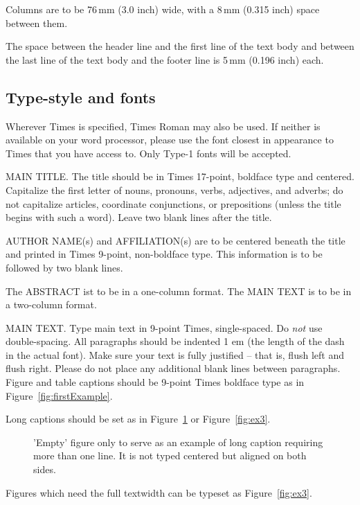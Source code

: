 Columns are to be 76\,mm (3.0 inch) wide, with a 8\,mm (0.315 inch) space
between them.

The space between the header line and the first line of the text body and
between the last line of the text body and the footer line is 5\,mm
(0.196 inch) each.

\subsection{Type-style and fonts}

Wherever Times is specified, Times Roman may also be used. If
neither is available on your word processor, please use the font
closest in appearance to Times that you have access to. Only
Type-1 fonts will be accepted.

MAIN TITLE. The title should be in Times 17-point, boldface type and
centered. Capitalize the first letter of nouns, pronouns, verbs, adjectives,
and adverbs; do not capitalize articles, coordinate conjunctions, or
prepositions (unless the title begins with such a word). Leave two blank
lines after the title.

AUTHOR NAME(s) and AFFILIATION(s) are to be centered beneath the title and
printed in Times 9-point, non-boldface type. This information is to be
followed by two blank lines.

The ABSTRACT ist to be in a one-column format. The MAIN TEXT is to be in a
two-column format.

MAIN TEXT. Type main text in 9-point Times, single-spaced. Do \emph{not} use
double-spacing. All paragraphs should be indented 1 em (the length of the
dash in the actual font). Make sure your text is fully justified -- that is,
flush left and flush right. Please do not place any additional blank lines
between paragraphs. Figure and table captions should be 9-point Times
boldface type as in Figure~\ref{fig:firstExample}.

\noindent Long captions should be set as in Figure~\ref{fig:ex1} or
Figure~\ref{fig:ex3}.

\begin{figure}[htb]
   \caption{\label{fig:ex1}
     'Empty' figure only to serve as an example of long caption requiring
     more than one line. It is not typed centered but aligned on both sides.}
\end{figure}

\noindent
Figures which need the full textwidth can be typeset as Figure~\ref{fig:ex3}.

